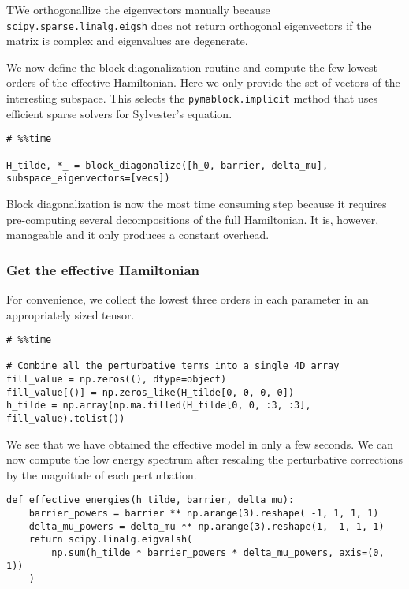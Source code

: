 TWe orthogonallize the eigenvectors manually because
\texttt{scipy.sparse.linalg.eigsh} does not return orthogonal eigenvectors if the
matrix is complex and eigenvalues are degenerate.

We now define the block diagonalization routine and compute the few lowest
orders of the effective Hamiltonian.
Here we only provide the set of vectors of the interesting subspace.
This selects the \texttt{pymablock.implicit} method that uses efficient sparse
solvers for Sylvester's equation.

\begin{verbatim}
# %%time

H_tilde, *_ = block_diagonalize([h_0, barrier, delta_mu], subspace_eigenvectors=[vecs])
\end{verbatim}

Block diagonalization is now the most time consuming step because it requires
pre-computing several decompositions of the full Hamiltonian.
It is, however, manageable and it only produces a constant overhead.

\subsubsection{Get the effective Hamiltonian}

For convenience, we collect the lowest three orders in each parameter in an
appropriately sized tensor.

\begin{verbatim}
# %%time

# Combine all the perturbative terms into a single 4D array
fill_value = np.zeros((), dtype=object)
fill_value[()] = np.zeros_like(H_tilde[0, 0, 0, 0])
h_tilde = np.array(np.ma.filled(H_tilde[0, 0, :3, :3], fill_value).tolist())
\end{verbatim}

We see that we have obtained the effective model in only a few seconds.
We can now compute the low energy spectrum after rescaling the perturbative
corrections by the magnitude of each perturbation.

\begin{verbatim}
def effective_energies(h_tilde, barrier, delta_mu):
    barrier_powers = barrier ** np.arange(3).reshape( -1, 1, 1, 1)
    delta_mu_powers = delta_mu ** np.arange(3).reshape(1, -1, 1, 1)
    return scipy.linalg.eigvalsh(
        np.sum(h_tilde * barrier_powers * delta_mu_powers, axis=(0, 1))
    )
\end{verbatim}

